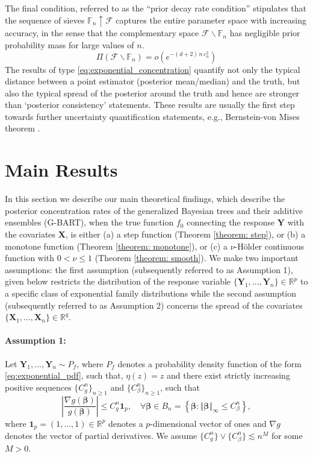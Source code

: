 \documentclass[12pt]{article}
\newcommand{\bm}[1]{\boldsymbol{#1}}
\newcommand{\Y}{\bm{Y}}
\newcommand{\norm}[1]{\left\Vert#1\right\Vert}
\newcommand{\abs}[1]{\left\vert#1\right\vert}
\newcommand{\1}{\mathbb{I}}
\def\mF{\mathcal{F}}
\def\b{\bm{\beta}}
\def\Y{\bm{Y}}
\def\X{\bm{X}}
\def\b{\bm{\beta}}
\def\b{\mbox{\boldmath$b$}}
\def\X{\mbox{\boldmath$X$}}
\renewcommand{\Y}{\bm{Y}}
\def\b{\bm{\beta}}
\def\X{\bm{X}}
\def\b{\bm{\beta}}
\theoremstyle{plain}
\theoremstyle{definition}
\theoremstyle{remark}
\begin{document}
The final condition, referred to as the ``prior decay rate condition'' stipulates that the sequence of sieves $\mathbb{F}_n \uparrow \mF$ captures the entire parameter space with increasing accuracy, in the sense that the complementary space $\mathcal{F} \backslash \mathbb{F}_n$ has negligible prior probability mass for large values of $n$.
\begin{equation}\label{eq:remain1}
\displaystyle \Pi(\mathcal{F} \backslash \mathbb{F}_n) = o(e^{-(d+2)\,n\,\varepsilon_n^2})  \tag{C3}
\end{equation}
The results of type \eqref{eq:exponential_concentration} quantify not only the typical distance between a point estimator (posterior mean/median) and the truth, but also the typical spread of the posterior around the truth and hence are stronger than `posterior consistency' statements. These results are usually the first step towards further uncertainty quantification statements, e.g., Bernstein-von Mises theorem \citep{castillo2014bernstein}.

\section{Main Results}\label{sec:results}
In this section we describe our main theoretical findings, which describe the posterior concentration rates of the generalized Bayesian trees and their additive ensembles (G-BART), when the true function $f_0$ connecting the response $\Y$ with the covariates $\X$, is either (a) a step function (Theorem \ref{theorem: step}), or (b) a monotone function (Theorem \ref{theorem: monotone}), or (c) a $\nu$-H\"{o}lder continuous function with $0 < \nu \le 1$ (Theorem \ref{theorem: smooth}). We make two important assumptions: the first assumption (subsequently referred to as Assumption 1), given below restricts the distribution of the response variable $\{\Y_1,\dots,\Y_n\} \in \mathbb{R}^{p}$ to a specific class of exponential family distributions while the second assumption (subsequently referred to as Assumption 2) concerns the spread of the covariates $\{\X_1, \dots, \X_n\} \in \mathbb{R}^{q}$.

\paragraph{Assumption 1:}
Let $\Y_1, \dots, \Y_n  \sim P_{f}$, where $P_{f}$ denotes a probability density function of the form \eqref{eq:exponential_pdf}, such that, $\eta(z) = z$ and there exist strictly increasing positive sequences $\{C^n_{g}\}_{n \ge 1}$ and $\{C^n_\beta\}_{n \ge 1}$, such that
\begin{equation}\label{eq:g_condition}
    \abs{\frac{\nabla g (\b)}{g(\b)}} \le C^n_{g} \textbf{1}_p, \quad \forall \b \in B_n= \left \{\b: \norm{\b}_\infty \le C^n_\beta \right\},
\end{equation}
where $\textbf{1}_p = (1,\dots,1) \in \mathbb{R}^p$ denotes a $p$-dimensional vector of ones and $\nabla g$ denotes the vector of partial derivatives. We assume $\{C^n_{g}\} \vee \{C^n_\beta\} \lesssim n^M$ for some $M > 0$. 
\end{document}
